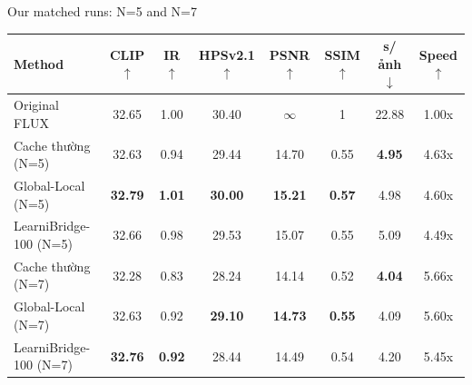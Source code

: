 \begin{frame}{Our matched runs: N=5 and N=7}
\begin{center}\scriptsize
\setlength{\tabcolsep}{3pt}
\renewcommand{\arraystretch}{1.15}
\begin{tabular}{lccccccc}
\toprule
Method & \textbf{CLIP $\uparrow$} & \textbf{IR $\uparrow$} & \textbf{HPSv2.1 $\uparrow$} & \textbf{PSNR $\uparrow$} & \textbf{SSIM $\uparrow$} & \textbf{s/ảnh $\downarrow$} & \textbf{Speed $\uparrow$} \\
\midrule
\textcolor{wrsMuted}{Original FLUX} & 32.65 & 1.00 & 30.40 & $\infty$ & 1 & 22.88 & 1.00x \\
Cache thường (N=5) & 32.63 & 0.94 & 29.44 & 14.70 & 0.55 & \textbf{\textcolor{wrsGreen}{4.95}} & 4.63x \\
Global-Local (N=5)\newline{\tiny\color{wrsMuted}(ours)} & \textbf{\textcolor{wrsGreen}{32.79}} & \textbf{\textcolor{wrsGreen}{1.01}} & \textbf{\textcolor{wrsGreen}{30.00}} & \textbf{\textcolor{wrsGreen}{15.21}} & \textbf{\textcolor{wrsGreen}{0.57}} & 4.98 & 4.60x \\
LearniBridge-100 (N=5) & 32.66 & 0.98 & 29.53 & 15.07 & 0.55 & 5.09 & 4.49x \\
Cache thường (N=7) & 32.28 & 0.83 & 28.24 & 14.14 & 0.52 & \textbf{\textcolor{wrsGreen}{4.04}} & 5.66x \\
Global-Local (N=7)\newline{\tiny\color{wrsMuted}(ours)} & 32.63 & 0.92 & \textbf{\textcolor{wrsGreen}{29.10}} & \textbf{\textcolor{wrsGreen}{14.73}} & \textbf{\textcolor{wrsGreen}{0.55}} & 4.09 & 5.60x \\
LearniBridge-100 (N=7) & \textbf{\textcolor{wrsGreen}{32.76}} & \textbf{\textcolor{wrsGreen}{0.92}} & 28.44 & 14.49 & 0.54 & 4.20 & 5.45x \\
\bottomrule
\end{tabular}
\end{center}
\vspace{0.25em}
\end{frame}

